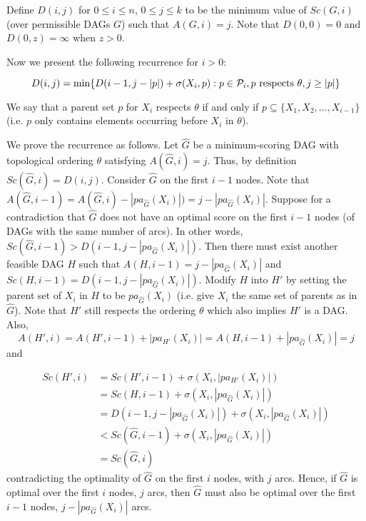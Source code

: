 \documentclass[twoside,11pt]{article}
\begin{document}
\bigskip{}
Define $D(i, j)$ for $0 \le i \le n$,  $0 \le j \le k$ to be the minimum value of $Sc(G,i)$ (over permissible DAGs $G$) such that $A(G,i) = j$. Note that $D(0, 0) = 0$ and $D(0, z) = \infty$ when $z > 0$.

\bigskip{}
Now we present the following recurrence for $i > 0$:

$$D(i, j) = \text{min} \{ D(i-1, j-|p|) + \sigma(X_i, p) : p \in \mathcal{P}_i, \text{$ p$ respects }\theta, j \ge |p| \}$$

We say that a parent set $p$ for $X_i$ respects $\theta$ if and only if $p \subseteq \{X_1, X_2, ..., X_{i-1} \}$ (i.e. $p$ only contains elements occurring before $X_i$ in $\theta$). 


\bigskip
We prove the recurrence as follows. Let $\hat{G}$ be a minimum-scoring DAG with topological ordering $\theta$ satisfying $A(\hat{G}, i) = j$. Thus, by definition $Sc(\hat{G},i) = D(i, j)$. 
Consider $\hat{G}$ on the first $i-1$ nodes. Note that $A(\hat{G}, i-1) = A(\hat{G}, i) - |pa_{\hat{G}}(X_i)|) = j - |pa_{\hat{G}}(X_i)|$. Suppose for a contradiction that $\hat{G}$ does not have an optimal score on the first $i-1$ nodes (of DAGs with the same number of arcs). In other words, $Sc(\hat{G}, i-1) > D(i-1, j-|pa_{\hat{G}}(X_i)|)$. Then there must exist another feasible DAG $H$ such that $A(H, i-1) = j-|pa_{\hat{G}}(X_i)|$ and $Sc(H, i-1) = D(i-1, j-|pa_{\hat{G}}(X_i)|)$. Modify $H$ into $H'$ by setting the parent set of $X_i$ in $H$ to be $pa_{\hat{G}}(X_i)$ (i.e. give $X_i$ the same set of parents as in $\hat{G}$). Note that $H'$ still respects the ordering $\theta$ which also implies $H'$ is a DAG. Also, $$A(H', i) = A(H', i-1) + |pa_{H'}(X_i)| = A(H, i-1) + |pa_{\hat{G}}(X_i)| = j$$
and 

\begin{align*}
Sc(H', i) &= Sc(H', i-1) + \sigma(X_i,  |pa_{H'}(X_i)|)  \\
&= Sc(H, i-1) + \sigma(X_i, |pa_{\hat{G}}(X_i)|) \\
&= D(i-1, j-|pa_{\hat{G}}(X_i)|) + \sigma(X_i, |pa_{\hat{G}}(X_i)|) \\
&< Sc(\hat{G}, i-1) + \sigma(X_i, |pa_{\hat{G}}(X_i)|) \\
&= Sc(\hat{G}, i)
\end{align*}
contradicting the optimality of $\hat{G}$ on the first $i$ nodes, with $j$ arcs. Hence, if $\hat{G}$ is optimal over the first $i$ nodes, $j$ arcs, then $\hat{G}$ must also be optimal over the first $i-1$ nodes, $j-|pa_{\hat{G}}(X_i)|$ arcs. 
\end{document}
